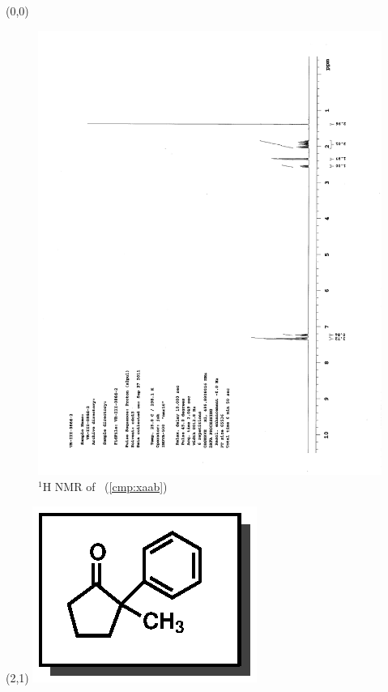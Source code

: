 \begin{textblock}{20}(0,0)
\begin{figure}[htb]
\caption{$^1$H NMR of \CMPxaab\ (\ref{cmp:xaab})}
\includegraphics[scale=0.75, trim = 0mm 0mm 0mm 5mm,
clip]{chp_asymmetric/images/nmr/xaabH}
\vspace{-100pt}
\end{figure}
\end{textblock}
\begin{textblock}{1}(2,1)
\includegraphics[scale=0.8, angle=90]{chp_asymmetric/images/xaab}
\end{textblock}
